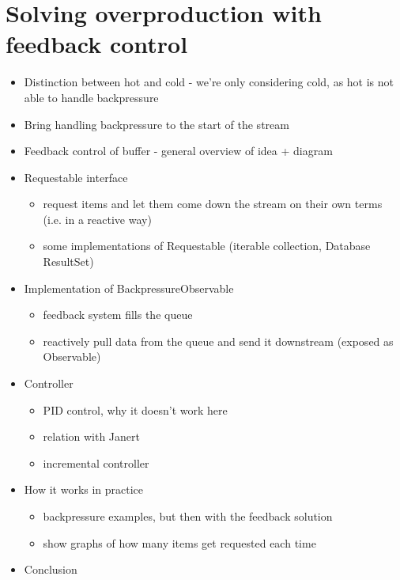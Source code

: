 \chapter{Solving overproduction with feedback control}
\label{chap:solving-overproduction}

\begin{itemize}
	\item Distinction between hot and cold - we're only considering cold, as hot is not able to handle backpressure
	\item Bring handling backpressure to the start of the stream
	\item Feedback control of buffer - general overview of idea + diagram
	\item Requestable interface
		\begin{itemize}
			\item request items and let them come down the stream on their own terms (i.e. in a reactive way)
			\item some implementations of Requestable (iterable collection, Database ResultSet)
		\end{itemize}
	\item Implementation of BackpressureObservable
		\begin{itemize}
			\item feedback system fills the queue
			\item reactively pull data from the queue and send it downstream (exposed as Observable)
		\end{itemize}
	\item Controller
		\begin{itemize}
			\item PID control, why it doesn't work here
			\item relation with Janert
			\item incremental controller
		\end{itemize}
	\item How it works in practice
		\begin{itemize}
			\item backpressure examples, but then with the feedback solution
			\item show graphs of how many items get requested each time
		\end{itemize}
	\item Conclusion
\end{itemize}

